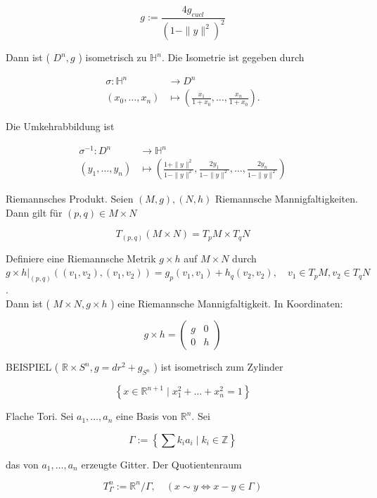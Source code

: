 \documentclass[10pt]{article}
\begin{document}
$$
g:=\frac{4 g_{e u c l}}{\left(1-\|y\|^{2}\right)^{2}}
$$

Dann ist ( $D^{n}, g$ ) isometrisch zu $\mathbb{H}^{n}$. Die Isometrie ist gegeben durch

$$
\begin{aligned}
\sigma: \mathbb{H}^{n} & \rightarrow D^{n} \\
\left(x_{0}, \ldots, x_{n}\right) & \mapsto\left(\frac{x_{1}}{1+x_{0}}, \ldots, \frac{x_{n}}{1+x_{0}}\right) .
\end{aligned}
$$

Die Umkehrabbildung ist

$$
\begin{aligned}
\sigma^{-1}: D^{n} & \rightarrow \mathbb{H}^{n} \\
\left(y_{1}, \ldots, y_{n}\right) & \mapsto\left(\frac{1+\|y\|^{2}}{1-\|y\|^{2}}, \frac{2 y_{1}}{1-\|y\|^{2}}, \ldots, \frac{2 y_{n}}{1-\|y\|^{2}}\right)
\end{aligned}
$$

Riemannsches Produkt. Seien $(M, g),(N, h)$ Riemannsche Mannigfaltigkeiten. Dann gilt für $(p, q) \in M \times N$

$$
T_{(p, q)}(M \times N)=T_{p} M \times T_{q} N
$$

Definiere eine Riemannsche Metrik $g \times h$ auf $M \times N$ durch $g \times\left. h\right|_{(p, q)}\left(\left(v_{1}, v_{2}\right),\left(v_{1}, v_{2}\right)\right)=g_{p}\left(v_{1}, v_{1}\right)+h_{q}\left(v_{2}, v_{2}\right), \quad v_{1} \in T_{p} M, v_{2} \in T_{q} N$.\\
Dann ist ( $M \times N, g \times h$ ) eine Riemannsche Mannigfaltigkeit. In Koordinaten:

$$
g \times h=\left(\begin{array}{cc}
g & 0 \\
0 & h
\end{array}\right)
$$

BEISPIEL ( $\mathbb{R} \times S^{n}, g=d r^{2}+g_{S^{n}}$ ) ist isometrisch zum Zylinder

$$
\left\{x \in \mathbb{R}^{n+1} \mid x_{1}^{2}+\ldots+x_{n}^{2}=1\right\}
$$

Flache Tori. Sei $a_{1}, \ldots, a_{n}$ eine Basis von $\mathbb{R}^{n}$. Sei

$$
\Gamma:=\left\{\sum k_{i} a_{i} \mid k_{i} \in \mathbb{Z}\right\}
$$

das von $a_{1}, \ldots, a_{n}$ erzeugte Gitter. Der Quotientenraum

$$
T_{\Gamma}^{n}:=\mathbb{R}^{n} / \Gamma, \quad(x \sim y \Longleftrightarrow x-y \in \Gamma)
$$
\end{document}
